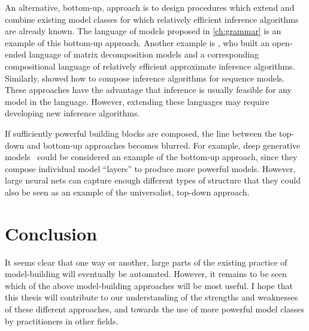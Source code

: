 An alternative, bottom-up, approach is to design procedures which extend and combine existing model classes for which relatively efficient inference algorithms are already known.
The language of models proposed in \cref{ch:grammar} is an example of this bottom-up approach.
Another example is \citet{roger-grosse-thesis}, who built an open-ended language of matrix decomposition models and a corresponding compositional language of relatively efficient approximate inference algorithms.
Similarly, \citet{christian-thesis} showed how to compose inference algorithms for sequence models.
These approaches have the advantage that inference is usually feasible for any model in the language.
However, extending these languages may require developing new inference algorithms.

If sufficiently powerful building blocks are composed, the line between the top-down and bottom-up approaches becomes blurred.
For example, deep generative models~\citep{adams2010learning,damianou2012deep,rippel2013high,bengio2013generalized,salakhutdinov2009deep} could be considered an example of the bottom-up approach, since they compose individual model ``layers'' to produce more powerful models.
However, large neural nets can capture enough different types of structure that they could also be seen as an example of the universalist, top-down approach.

\section{Conclusion}
It seems clear that one way or another, large parts of the existing practice of model-building will eventually be automated.
However, it remains to be seen which of the above model-building approaches will be most useful.
I hope that this thesis will contribute to our understanding of the strengths and weaknesses of these different approaches, and towards the use of more powerful model classes by practitioners in other fields.






